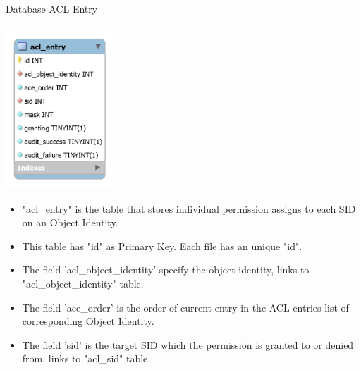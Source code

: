 \begin{table}[H]
  \centering
  \caption{Database ACL Entry}
  \label{tbl:dbACL}
  \includegraphics[width=0.3\textwidth]{images/DatabaseAclEntryDesign.PNG}
\end{table}
\begin{itemize}
    \item "acl\_entry" is the table that stores individual permission assigns to each SID on an Object Identity.
    \item This table has "id" as Primary Key. Each file has an unique "id".
    \item The field 'acl\_object\_identity' specify the object identity, links to "acl\_object\_identity" table. 
    \item The field 'ace\_order' is the order of current entry in the ACL entries list of corresponding Object Identity.
    \item The field 'sid' is the target SID which the permission is granted to or denied from, links to "acl\_sid" table.
\end{itemize}

